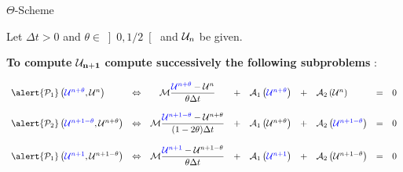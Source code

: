 \begin{frame}{$\Theta$-Scheme}

    \scriptsize
{}

\vskip 0.5cm
Let $\Delta t > 0$ and $\theta \in \left] 0,1/2 \right[$ and $\mathcal{U}_n$ be given. 
    
    \vskip 0.2cm
    \textbf{To compute } \textcolor{blue}{$\mathbf{\mathcal{U}_{n+1}}$} \textbf{compute successively the following subproblems} :

    \tiny
$$
\begin{array}{l c c c l c l c r}
    \alert{\mathcal{P}_1}\left(\textcolor{blue}{\Uv},\Uu\right)&\Leftrightarrow&
    \M\dfrac{\textcolor{blue}{\Uv} - \Uu}{\theta \Delta t}&+&\A{1}{\textcolor{blue}{\Uv}}&+&\A{2}{\Uu}&=&0\\
    \\
    \alert{\mathcal{P}_2}\left(\textcolor{blue}{\Uw},\Uv\right)&\Leftrightarrow&
    \M\dfrac{\textcolor{blue}{\Uw} - \Uv}{(1-2\theta) \Delta t}&+&\A{1}{\Uv}&+&\A{2}{\textcolor{blue}{\Uw}}&=&0\\
    \\
    \alert{\mathcal{P}_1}\left(\textcolor{blue}{\Ux},\Uw\right)&\Leftrightarrow&
    \M\dfrac{\textcolor{blue}{\Ux} - \Uw}{\theta \Delta t}&+&\A{1}{\textcolor{blue}{\Ux}}&+&\A{2}{\Uw}&=&0
\end{array}
$$

\vskip 0.5cm
    \scriptsize


\end{frame}




